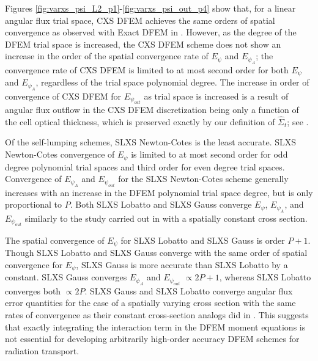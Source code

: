 Figures \ref{fig:varxs_psi_L2_p1}-\ref{fig:varxs_psi_out_p4} show that, for a linear angular flux trial space, CXS DFEM achieves the same orders of spatial convergence as observed with Exact DFEM in \cite{part_1_paper}.
However, as the degree of the DFEM trial space is increased, the CXS DFEM scheme does not show an increase in the order of the spatial convergence rate of  $E_{\psi}$ and $E_{\psi_A}$; the convergence rate of CXS DFEM is limited to at most second order for both $E_{\psi}$ and $E_{\psi_A}$, regardless of the trial space polynomial degree.  
The increase in order of convergence of CXS DFEM for $E_{\psi_{out}}$ as trial space is increased is a result of angular flux outflow in the
CXS DFEM discretization being only a function of the cell optical thickness, which is preserved exactly by our definition of $\hat{\Sigma}_t$; see .

Of the self-lumping schemes, SLXS Newton-Cotes is the least accurate.  SLXS Newton-Cotes convergence of $E_{\psi}$ is limited to at most second order for odd degree polynomial trial spaces and third order for even degree trial spaces.  
Convergence of $E_{\psi_A}$ and $E_{\psi_{out}}$ for the SLXS Newton-Cotes scheme generally increases with an increase in the DFEM polynomial trial space degree, but is only proportional to $P$.
Both SLXS Lobatto and SLXS Gauss converge $E_{\psi}$, $E_{\psi_A}$, and $E_{\psi_{out}}$ similarly to the study carried out in \cite{part_1_paper} with a spatially constant cross section.

The spatial convergence of $E_{\psi}$ for SLXS Lobatto and SLXS Gauss is order $P+1$.
Though SLXS Lobatto and SLXS Gauss converge with the same order of spatial convergence for $E_{\psi}$, SLXS Gauss is more accurate than SLXS Lobatto by a constant.  
SLXS Gauss converges $E_{\psi_A}$ and $E_{\psi_{out}}$ $\propto 2P+1$, whereas SLXS Lobatto converges both $\propto 2P$.
SLXS Gauss and SLXS Lobatto converge angular flux error quantities for the case of a spatially varying cross section with the same rates of convergence as their constant cross-section analogs did in \cite{part_1_paper}.
This suggests that exactly integrating the interaction term in the DFEM moment equations is not essential for developing arbitrarily high-order accuracy DFEM schemes for radiation transport.

